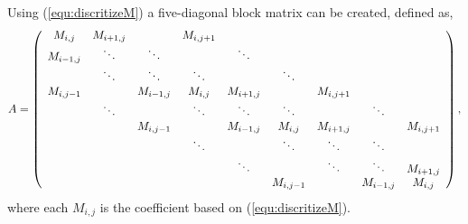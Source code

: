 \documentclass{article}
\theoremstyle{plain}
\begin{document}
  Using (\ref{equ:discritizeM}) a five-diagonal block matrix can be created, defined as,
  \begin{equation} \label{equ:five_diagonal_matrix_M}
    A = 
    \left( 
      \begin{array}{c c c c c c c c c c}
        M_{i,j} & M_{i+1,j} &  & M_{i,j+1} &   \\
        M_{i-1,j} & \ddots & \ddots &   &  \ddots &   \\
        & \ddots & \ddots & \ddots & & \ddots & \\
        M_{i,j-1} &  & M_{i-1,j} & M_{i,j} & M_{i+1,j} &   &  M_{i,j+1} &   \\
        & \ddots & & \ddots & \ddots & \ddots & & \ddots\\
        & & M_{i,j-1} &  & M_{i-1,j} & M_{i,j} & M_{i+1,j} &  & M_{i,j+1} \\
        & & & \ddots & & \ddots & \ddots & \ddots & \\
        & & & & \ddots & & \ddots & \ddots & M_{i+1,j} \\
        & & & & & M_{i,j-1} & & M_{i-1,j} & M_{i,j}
      \end{array}
    \right),
  \end{equation}
  where each $M_{i,j}$ is the coefficient based on (\ref{equ:discritizeM}).
 
\end{document}
